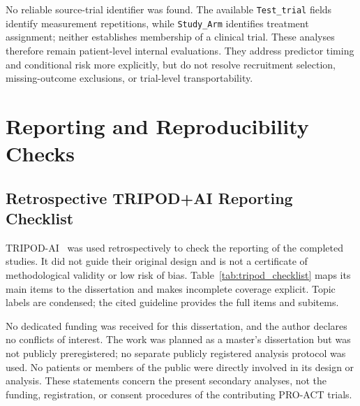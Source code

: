 No reliable source-trial identifier was found. The available \texttt{Test\_trial} fields identify measurement repetitions, while \texttt{Study\_Arm} identifies treatment assignment; neither establishes membership of a clinical trial. These analyses therefore remain patient-level internal evaluations. They address predictor timing and conditional risk more explicitly, but do not resolve recruitment selection, missing-outcome exclusions, or trial-level transportability.

\chapter{Reporting and Reproducibility Checks}
\label{app:reporting_checks}

\section{Retrospective TRIPOD+AI Reporting Checklist}
\label{app:tripod_checklist}

\gls{TRIPOD-AI}~\cite{collins2024tripodai} was used retrospectively to check the reporting of the completed studies. It did not guide their original design and is not a certificate of methodological validity or low risk of bias. Table~\ref{tab:tripod_checklist} maps its main items to the dissertation and makes incomplete coverage explicit. Topic labels are condensed; the cited guideline provides the full items and subitems.

No dedicated funding was received for this dissertation, and the author declares no conflicts of interest. The work was planned as a master's dissertation but was not publicly preregistered; no separate publicly registered analysis protocol was used. No patients or members of the public were directly involved in its design or analysis. These statements concern the present secondary analyses, not the funding, registration, or consent procedures of the contributing PRO-ACT trials.

